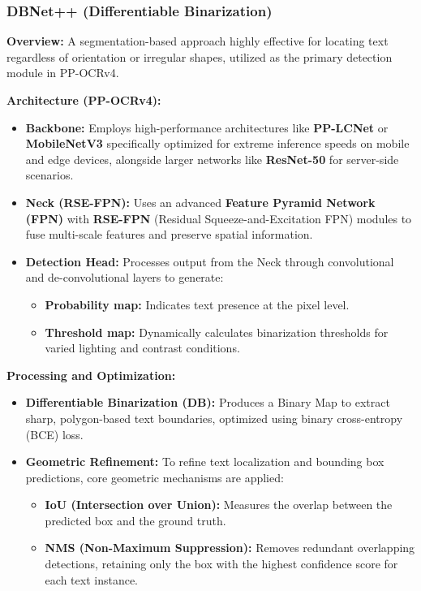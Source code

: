 \subsubsection{DBNet++ (Differentiable Binarization)}
\textbf{Overview:} A segmentation-based approach highly effective for locating text regardless of orientation or irregular shapes, utilized as the primary detection module in PP-OCRv4.

\textbf{Architecture (PP-OCRv4):}
\begin{itemize}
    \item \textbf{Backbone:} Employs high-performance architectures like \textbf{PP-LCNet} or \textbf{MobileNetV3} specifically optimized for extreme inference speeds on mobile and edge devices, alongside larger networks like \textbf{ResNet-50} for server-side scenarios.
    \item \textbf{Neck (RSE-FPN):} Uses an advanced \textbf{Feature Pyramid Network (FPN)} with \textbf{RSE-FPN} (Residual Squeeze-and-Excitation FPN) modules to fuse multi-scale features and preserve spatial information.
    \item \textbf{Detection Head:} Processes output from the Neck through convolutional and de-convolutional layers to generate:
          \begin{itemize}
              \item \textbf{Probability map:} Indicates text presence at the pixel level.
              \item \textbf{Threshold map:} Dynamically calculates binarization thresholds for varied lighting and contrast conditions.
          \end{itemize}
\end{itemize}

\textbf{Processing and Optimization:}
\begin{itemize}
    \item \textbf{Differentiable Binarization (DB):} Produces a Binary Map to extract sharp, polygon-based text boundaries, optimized using binary cross-entropy (BCE) loss.
    \item \textbf{Geometric Refinement:} To refine text localization and bounding box predictions, core geometric mechanisms are applied:
          \begin{itemize}
              \item \textbf{IoU (Intersection over Union):} Measures the overlap between the predicted box and the ground truth.
              \item \textbf{NMS (Non-Maximum Suppression):} Removes redundant overlapping detections, retaining only the box with the highest confidence score for each text instance.
          \end{itemize}
\end{itemize}

